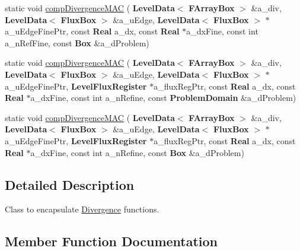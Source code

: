 \begin{DoxyCompactItemize}
\item 
static void \hyperlink{class_divergence_ab223946c8b00bee70b0f73530ef274fe}{comp\+Divergence\+M\+AC} (\textbf{ Level\+Data}$<$ \textbf{ F\+Array\+Box} $>$ \&a\+\_\+div, \textbf{ Level\+Data}$<$ \textbf{ Flux\+Box} $>$ \&a\+\_\+u\+Edge, \textbf{ Level\+Data}$<$ \textbf{ Flux\+Box} $>$ $\ast$a\+\_\+u\+Edge\+Fine\+Ptr, const \textbf{ Real} a\+\_\+dx, const \textbf{ Real} $\ast$a\+\_\+dx\+Fine, const int a\+\_\+n\+Ref\+Fine, const \textbf{ Box} \&a\+\_\+d\+Problem)
\item 
static void \hyperlink{class_divergence_a7ea9ccc4a12abac5f0141e67c69f9c0f}{comp\+Divergence\+M\+AC} (\textbf{ Level\+Data}$<$ \textbf{ F\+Array\+Box} $>$ \&a\+\_\+div, \textbf{ Level\+Data}$<$ \textbf{ Flux\+Box} $>$ \&a\+\_\+u\+Edge, \textbf{ Level\+Data}$<$ \textbf{ Flux\+Box} $>$ $\ast$a\+\_\+u\+Edge\+Fine\+Ptr, \textbf{ Level\+Flux\+Register} $\ast$a\+\_\+flux\+Reg\+Ptr, const \textbf{ Real} a\+\_\+dx, const \textbf{ Real} $\ast$a\+\_\+dx\+Fine, const int a\+\_\+n\+Refine, const \textbf{ Problem\+Domain} \&a\+\_\+d\+Problem)
\item 
static void \hyperlink{class_divergence_a6edc8c244f67ac7fcaf54386a1fed40b}{comp\+Divergence\+M\+AC} (\textbf{ Level\+Data}$<$ \textbf{ F\+Array\+Box} $>$ \&a\+\_\+div, \textbf{ Level\+Data}$<$ \textbf{ Flux\+Box} $>$ \&a\+\_\+u\+Edge, \textbf{ Level\+Data}$<$ \textbf{ Flux\+Box} $>$ $\ast$a\+\_\+u\+Edge\+Fine\+Ptr, \textbf{ Level\+Flux\+Register} $\ast$a\+\_\+flux\+Reg\+Ptr, const \textbf{ Real} a\+\_\+dx, const \textbf{ Real} $\ast$a\+\_\+dx\+Fine, const int a\+\_\+n\+Refine, const \textbf{ Box} \&a\+\_\+d\+Problem)
\end{DoxyCompactItemize}


\subsection{Detailed Description}
Class to encapsulate \hyperlink{class_divergence}{Divergence} functions. 

\subsection{Member Function Documentation}
\mbox{\label{class_divergence_af3bff43b62b95d79fcd50484019e3e41}} 
